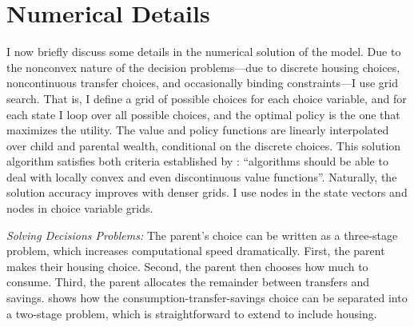 \documentclass[12pt]{article}
\begin{document}
\begin{table}
	\center 
\end{table}

\section{Numerical Details}\label{sec:computational}
I now briefly discuss some details in the numerical solution of the model. Due to the nonconvex nature of the decision problems---due to discrete housing choices, noncontinuous transfer choices, and occasionally binding constraints---I use grid search. That is, I define a grid of possible choices for each choice variable, and for each state I loop over all possible choices, and the optimal policy is the one that maximizes the utility. The value and policy functions are linearly interpolated over child and parental wealth, conditional on the discrete choices. This solution algorithm satisfies both criteria established by \cite[p.30]{Barczyk2020}: ``algorithms should be able to deal with locally convex and even discontinuous value functions''. Naturally, the solution accuracy improves with denser grids. I use {\parnstate} nodes in the state vectors and {\parnchoice} nodes in choice variable grids.

\textit{Solving Decisions Problems:} 
The parent's choice can be written as a three-stage problem, which increases computational speed dramatically. First, the parent makes their housing choice. Second, the parent then chooses how much to consume. Third, the parent allocates the remainder between transfers and savings. \cite{Chu2020} shows how the consumption-transfer-savings choice can be separated into a two-stage problem, which is straightforward to extend to include housing.
\end{document}
